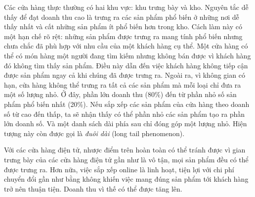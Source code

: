 Các {cửa hàng thực} thường có hai khu vực: khu trưng bày và kho. Nguyên tắc dễ thấy để đạt doanh thu cao là trưng ra các sản phẩm phổ biến ở những nơi dễ thấy nhất và cất những sản phẩm ít phổ biến hơn trong kho. Cách
làm này có một hạn chế rõ rệt: những sản phẩm được trưng ra mang tính phổ biến
nhưng chưa chắc đã phù hợp với nhu cầu của một khách hàng cụ thể. Một cửa hàng có thể có món hàng một người đang tìm kiếm nhưng không bán được vì khách hàng đó không tìm thấy sản phẩm. Điều này dẫn đến việc khách hàng không tiếp cận
được sản phẩm ngay cả khi chúng đã được trưng ra. Ngoài ra, vì không gian có
hạn, cửa hàng không thể trưng ra tất cả các sản phẩm mà mỗi loại chỉ đưa ra một
số lượng nhỏ. Ở đây, phần lớn doanh thu (80\%) đến từ phần nhỏ số sản phẩm phổ
biến nhất (20\%). Nếu sắp xếp các sản phẩm của cửa hàng theo doanh số từ cao đến
thấp, ta sẽ nhận thấy có thể phần nhỏ các sản phẩm tạo ra phần lớn doanh số. Và
một danh sách dài phía sau chỉ đóng góp một lượng nhỏ. Hiện tượng này còn
được gọi là \textit{đuôi dài} (long tail phenomenon).

Với các {cửa hàng điện tử}, nhược điểm trên hoàn toàn có thể tránh được vì {gian trưng bày} của các {cửa hàng điện tử} gần như là vô tận,
mọi sản phẩm đều có thể được trưng ra. Hơn nữa, việc sắp xếp online là linh
hoạt, tiện lợi với chi phí chuyển đổi gần như bằng không khiến việc mang đúng sản
phẩm tới khách hàng trở nên thuận tiện. Doanh thu vì thế có thể được tăng
lên.





